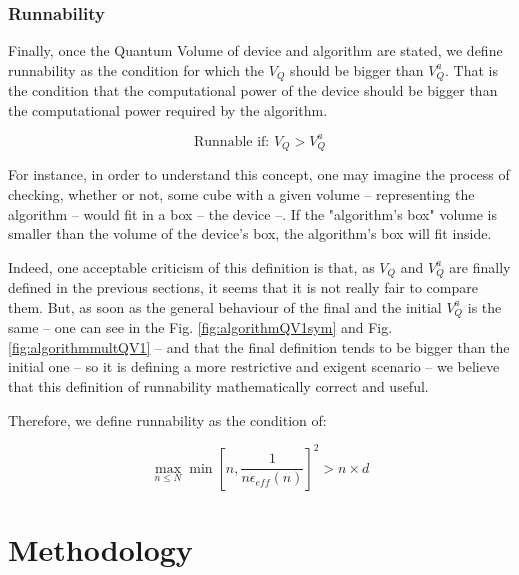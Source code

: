 \documentclass[11pt]{article}
\begin{document}
\subsubsection{Runnability}
\label{sec:orga4b1848}

Finally, once the Quantum Volume of device and algorithm are stated, we define runnability as the condition for which the \(V_Q\) should be bigger than \(V^a_Q\).
That is the condition that the computational power of the device should be bigger than the computational power required by the algorithm.

$$\text{Runnable if: } V_Q > V^a_Q$$

For instance, in order to understand this concept, one may imagine the process of checking, whether or not, some cube with a given volume -- representing the algorithm -- would fit in a box -- the device --.
If the "algorithm's box" volume is smaller than the volume of the device's box, the algorithm's box will fit inside.

Indeed, one acceptable criticism of this definition is that, as \(V_Q\) and \(V^a_Q\) are finally defined in the previous sections, it seems that it is not really fair to compare them.
But, as soon as the general behaviour of the final and the initial \(V^a_Q\) is the same -- one can see in the Fig. \ref{fig:algorithmQV1sym} and Fig. \ref{fig:algorithmmultQV1} -- and that the final definition tends to be bigger than the initial one -- so it is defining a more restrictive and exigent scenario -- we believe that this definition of runnability mathematically correct and useful.

Therefore, we define runnability as the condition of:

$$\max_{n \le N} \min \left[ n,\frac{1}{n \epsilon_{eff} (n)}\right]^2 > n \times d$$

\section{Methodology}
\label{sec:orgae8d2fe}



\end{document}
